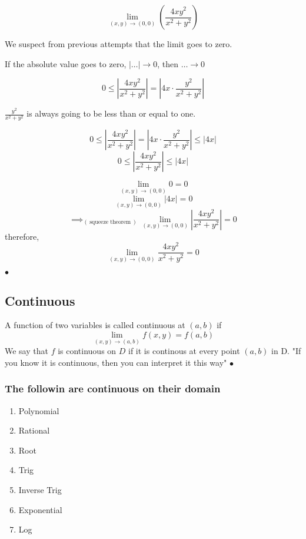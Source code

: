 \begin{example}
	\[\lim_{(x,y) \to (0,0)}\left( \frac{4xy^2}{x^2+y^2} \right) \]

	We suspect from previous attempts that the limit goes to zero.

	If the absolute value goes to zero, $|\ldots| \to 0$, then $\ldots \to 0$

	\[0 \le \left| \frac{4xy^2}{x^2+y^2} \right| = \left| 4x \cdot \frac{y^2}{x^2+y^2} \right| \]

	$\frac{y^2}{x^2 + y^2}$ is always going to be less than or equal to one.

	\[0 \le \left| \frac{4xy^2}{x^2+y^2} \right| = \left| 4x \cdot \frac{y^2}{x^2+y^2} \right| \le \left| 4x \right| \]
	\[0 \le \left| \frac{4xy^2}{x^2+y^2} \right|  \le \left| 4x \right| \]

	\[\lim_{(x,y) \to (0,0)} 0 = 0\]
	\[\lim_{(x,y) \to (0,0)} \left| 4x \right|  = 0\]
	\[\implies_{(\:\text{squeeze theorem}\:)} \lim_{(x,y) \to (0,0)} \left| \frac{4xy^2}{x^2+y^2} \right| = 0\]
	therefore, \[\lim_{(x,y) \to (0,0)} \frac{4xy^2}{x^2+y^2}  = \boxed{ 0}\]

\smallskip\hfill$\bullet$\end{example}

\subsection{Continuous}%
\label{sub:continuous}

\begin{definition}[Continuous]
	A function of two variables is called continuous at $(a,b)$ if \[
	\lim_{(x,y) \to (a,b)} f(x,y) = f(a,b)\]
	We say that $f$ is continuous on $D$ if it is continous at every point $(a,b)$ in D.
	"If you know it is continuous, then you can interpret it this way"
\smallskip\hfill$\bullet$\end{definition}
\subsubsection{The followin are continuous on their domain}%
\begin{enumerate}
	\item Polynomial
		\item Rational
			\item Root
				\item Trig
					\item Inverse Trig
						\item Exponential
							\item Log
\end{enumerate}
\label{ssub:the_followin_are_continuous_on_their_domain}



\newpage


